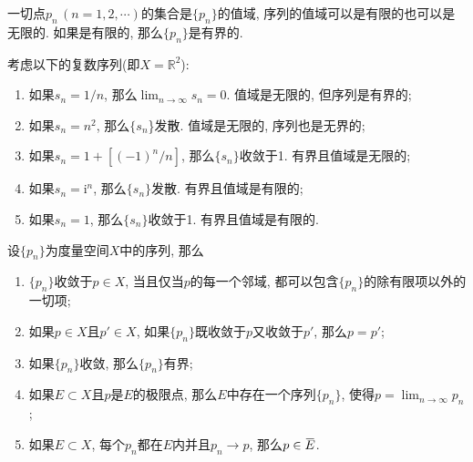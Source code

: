 \documentclass[cn,12pt,math=mtpro2,citestyle=gb7714-2015,bibstyle=gb7714-2015,twocol]{elegantbook}
\newcommand{\R}{\mathbb{R}}
\newcommand{\limn}{\lim_{n\to\infty}}
\newcommand{\overbar}[1]{\mkern 1.5mu\overline{\mkern-1.5mu#1\mkern-1.5mu}\mkern 1.5mu}
\begin{document}
\begin{definition}
一切点$p_n\,(n=1,2,\cdots)$的集合是$\{p_n\}$的值域, 序列的值域可以是有限的也可以是无限的. 如果是有限的, 那么$\{p_n\}$是有界的.
\end{definition}
\begin{example}
考虑以下的复数序列(即$X=\R^2$):
\begin{enumerate}[label=(\alph*)]
\item 如果$s_n=1/n$, 那么$\displaystyle\limn  s_n=0$. 值域是无限的, 但序列是有界的;

\item 如果$s_n=n^2$, 那么$\{s_n$\}发散. 值域是无限的, 序列也是无界的;

\item 如果$s_n=1+[(-1)^n/n]$, 那么$\{s_n\}$收敛于1. 有界且值域是无限的;

\item 如果$s_n=\text{i}^n$, 那么$\{s_n\}$发散. 有界且值域是有限的;

\item 如果$s_n=1$, 那么$\{s_n\}$收敛于1. 有界且值域是有限的.
\end{enumerate}
\end{example}
\begin{theorem}\label{thm:th3.5}
  设$\{p_n\}$为度量空间$X$中的序列, 那么
  \begin{enumerate}[label=(\arabic*)]
  \item $\{p_n\}$收敛于$p\in X$, 当且仅当$p$的每一个邻域, 都可以包含$\{p_n\}$的除有限项以外的一切项;

  \item 如果$p\in X$且$p'\in X$, 如果$\{p_n\}$既收敛于$p$又收敛于$p'$, 那么$p=p'$;

  \item 如果$\{p_n\}$收敛, 那么$\{p_n\}$有界;

  \item 如果$E\subset X$且$p$是$E$的极限点, 那么$E$中存在一个序列$\{p_n\}$, 使得$ p=\limn  p_n$;

  \item 如果$E\subset X$, 每个$p_n$都在$E$内并且$p_n\rightarrow p$, 那么$p\in \overbar{E}$.
  \end{enumerate}
  \end{theorem}
\end{document}
